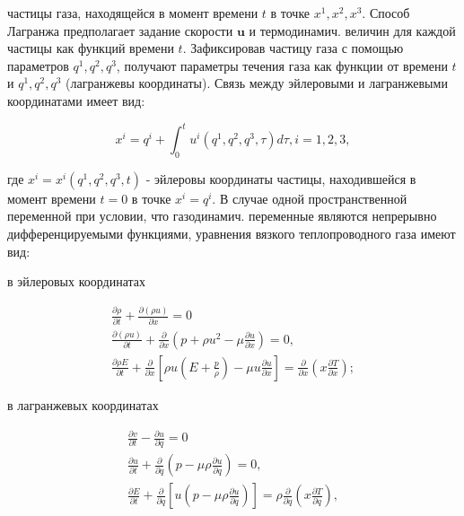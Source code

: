 \documentclass[10pt]{article}
\begin{document}
частицы газа, находящейся в момент времени $t$ в точке $x^{1}, x^{2}, x^{3}$. Способ Лагранжа предполагает задание скорости $\boldsymbol{u}$ и термодинамич. величин для каждой частицы как функций времени $t$. Зафиксировав частицу газа с помощью параметров $q^{1}, q^{2}, q^{3}$, получают параметры течения газа как функции от времени $t$ и $q^{1}, q^{2}, q^{3}$ (лагранжевы координаты). Связь между эйлеровыми и лагранжевыми координатами имеет вид:



\[

x^{i}=q^{i}+\int_{0}^{t} u^{i}\left(q^{1}, q^{2}, q^{3}, \tau\right) d \tau, i=1,2,3,

\]



где $x^{i}=x^{i}\left(q^{1}, q^{2}, q^{3}, t\right)$ - эйлеровы координаты частицы, находившейся в момент времени $t=0$ в точке $x^{i}=q^{i}$. В случае одной пространственной переменной при условии, что газодинамич. переменные являются непрерывно дифференцируемыми функциями, уравнения вязкого теплопроводного газа имеют вид:



в эйлеровых координатах



\[

\begin{gathered}

\frac{\partial \rho}{\partial t}+\frac{\partial(\rho u)}{\partial x}=0 \\

\frac{\partial(\rho u)}{\partial t}+\frac{\partial}{\partial x}\left(p+\rho u^{2}-\mu \frac{\partial u}{\partial x}\right)=0, \\

\frac{\partial \rho E}{\partial t}+\frac{\partial}{\partial x}\left[\rho u\left(E+\frac{p}{\rho}\right)-\mu u \frac{\partial u}{\partial x}\right]=\frac{\partial}{\partial x}\left(x \frac{\partial T}{\partial x}\right) ;

\end{gathered}

\]



в лагранжевых координатах



\[

\begin{gathered}

\frac{\partial v}{\partial t}-\frac{\partial u}{\partial q}=0 \\

\frac{\partial u}{\partial t}+\frac{\partial}{\partial q}\left(p-\mu \rho \frac{\partial u}{\partial q}\right)=0, \\

\frac{\partial E}{\partial t}+\frac{\partial}{\partial q}\left[u\left(p-\mu \rho \frac{\partial u}{\partial q}\right)\right]=\rho \frac{\partial}{\partial q}\left(x \frac{\partial T}{\partial q}\right),

\end{gathered}

\]
\end{document}
